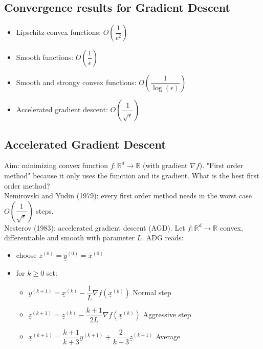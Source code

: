 \subsection{Convergence results for Gradient Descent}
\begin{itemize}
    \item Lipschitz-convex functions: $O\left(\dfrac{1}{\epsilon^2}\right)$
    \item Smooth functions: $O\left(\dfrac{1}{\epsilon}\right)$
    \item Smooth and strongy convex functions: $O\left(\dfrac{1}{\log(\epsilon)}\right)$
    \item Accelerated gradient descent: $O\left(\dfrac{1}{\sqrt{\epsilon}}\right)$
\end{itemize}

\subsection{Accelerated Gradient Descent}
Aim: minimizing convex function $f: \mathbb{R}^d \to \mathbb{R}$ (with gradient $\nabla f$). "First order method" because it only uses the function and its gradient. What is the best first order method?\\
Nemirovski and Yudin (1979): every first order method needs in the worst case $O\left(\dfrac{1}{\sqrt{\epsilon}}\right)$ steps. \\
Nesterov (1983): accelerated gradient descent (AGD). Let $f: \mathbb{R}^d \to \mathbb{R}$ convex, differentiable and smooth with parameter $L$. ADG reads:
\begin{itemize}
    \item choose $\underline{z}^{(0)} = \underline{y}^{(0)} = \underline{x}^{(0)}$
    \item for $k \geq 0$ set:
    \begin{itemize}
        \item $\underline{y}^{(k+1)} = \underline{x}^{(k)} - \dfrac{1}{L} \nabla f(\underline{x}^{(k)})$ \hspace{2cm} Normal step
        \item $\underline{z}^{(k+1)} = \underline{z}^{(k)} - \dfrac{k+1}{2L} \nabla f (\underline{x}^{(k)})$ \hspace{2cm} Aggressive step
        \item $\underline{x}^{(k+1)} = \dfrac{k+1}{k+3} \underline{y}^{(k+1)} + \dfrac{2}{k+3} \underline{z}^{(k+1)}$ \hspace{2cm} Average 
    \end{itemize}
\end{itemize}

